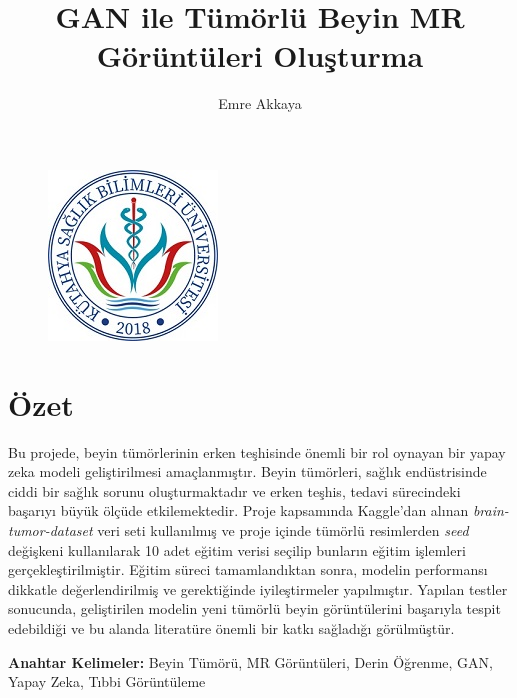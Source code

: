 \documentclass[10pt]{article}
\title{GAN ile Tümörlü Beyin MR Görüntüleri Oluşturma}
\author{Emre Akkaya}
\begin{document}
	
	\begin{figure}
		\centering
		\includegraphics{ksbu.jpg}
	\end{figure}
	
	\maketitle
	
	\section*{Özet}
	Bu projede, beyin tümörlerinin erken teşhisinde önemli bir rol oynayan bir yapay zeka modeli geliştirilmesi amaçlanmıştır. Beyin tümörleri, sağlık endüstrisinde ciddi bir sağlık sorunu oluşturmaktadır ve erken teşhis, tedavi sürecindeki başarıyı büyük ölçüde etkilemektedir. Proje kapsamında Kaggle'dan alınan \textit{brain-tumor-dataset} veri seti kullanılmış ve proje içinde tümörlü resimlerden \textit{seed} değişkeni kullanılarak 10 adet eğitim verisi seçilip bunların eğitim işlemleri gerçekleştirilmiştir. Eğitim süreci tamamlandıktan sonra, modelin performansı dikkatle değerlendirilmiş ve gerektiğinde iyileştirmeler yapılmıştır. Yapılan testler sonucunda, geliştirilen modelin yeni tümörlü beyin görüntülerini başarıyla tespit edebildiği ve bu alanda literatüre önemli bir katkı sağladığı görülmüştür.
	
	\noindent \textbf{Anahtar Kelimeler:} Beyin Tümörü, MR Görüntüleri, Derin Öğrenme, GAN, Yapay Zeka, Tıbbi Görüntüleme
	
\end{document}

